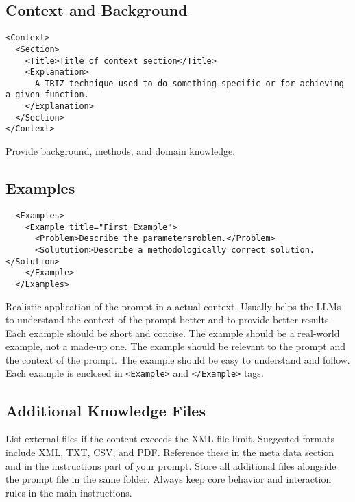\documentclass[a4paper,11pt]{refart}
\begin{document}
\subsection{Context and Background}
\begin{lstlisting}
<Context>
  <Section>
    <Title>Title of context section</Title>
    <Explanation>
      A TRIZ technique used to do something specific or for achieving a given function.
    </Explanation>
  </Section>
</Context>
\end{lstlisting}
Provide background, methods, and domain knowledge.

\subsection{Examples}
\begin{lstlisting}
  <Examples>
    <Example title="First Example">
      <Problem>Describe the parametersroblem.</Problem>
      <Solutution>Describe a methodologically correct solution.</Solution>
    </Example>
  </Examples>
\end{lstlisting}
Realistic application of the prompt in a actual context. Usually helps the LLMs to understand the context of the prompt better and to provide better results. Each example should be short and concise. The example should be a real-world example, not a made-up one. The example should be relevant to the prompt and the context of the prompt. The example should be easy to understand and follow. Each example is enclosed in \lstinline!<Example>! and \lstinline!</Example>! tags.

\subsection{Additional Knowledge Files}
List external files if the content exceeds the XML file limit. Suggested formats include XML, TXT, CSV, and PDF. Reference these in the meta data section and in the instructions part of your prompt. Store all additional files alongside the prompt file in the same folder. Always keep core behavior and interaction rules in the main instructions.
\end{document}
